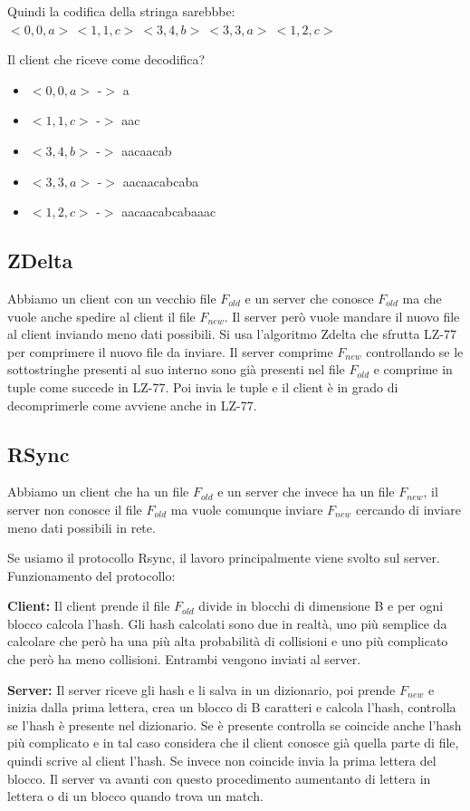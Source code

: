 \documentclass[14pt]{extreport}
\begin{document}
Quindi la codifica della stringa sarebbbe: $<0,0,a>\, <1,1,c> \ <3,4,b>\ <3,3,a> \ <1,2,c>$

\newline
Il client che riceve come decodifica?

\begin{itemize}
    \item $<0,0,a>$ -$>$ a
    \item $<1,1,c>$ -$>$ aac
    \item $<3,4,b>$ -$>$ aacaacab
    \item $<3,3,a>$ -$>$ aacaacabcaba
    \item $<1,2,c>$ -$>$ aacaacabcabaaac
\end{itemize}

\subsection{ZDelta}

Abbiamo un client con un vecchio file $F_{old}$ e un server che conosce $F_{old}$ ma che vuole anche spedire al client il file $F_{new}$.
Il server però vuole mandare il nuovo file al client inviando meno dati possibili.
Si usa l'algoritmo Zdelta che sfrutta LZ-77 per comprimere il nuovo file da inviare.
Il server comprime $F_{new}$ controllando se le sottostringhe presenti al suo interno sono già presenti nel file $F_{old}$ e comprime in tuple come succede in LZ-77.
Poi invia le tuple e il client è in grado di decomprimerle come avviene anche in LZ-77.

\subsection{RSync}

Abbiamo un client che ha un file $F_{old}$ e un server che invece ha un file $F_{new}$, il server non conosce il file $F_{old}$ ma vuole comunque inviare $F_{new}$ cercando di inviare meno dati possibili in rete.

Se usiamo il protocollo Rsync, il lavoro principalmente viene svolto sul server.
Funzionamento del protocollo:

{\bf Client:} Il client prende il file $F_{old}$ divide in blocchi di dimensione B e per ogni blocco calcola l'hash. Gli hash calcolati sono due in realtà, uno più semplice da calcolare che però ha una più alta probabilità di collisioni e uno più complicato che però ha meno collisioni. Entrambi vengono inviati al server.

{\bf Server:} Il server riceve gli hash e li salva in un dizionario, poi prende $F_{new}$ e inizia dalla prima lettera, crea un blocco di B caratteri e calcola l'hash, controlla se l'hash è presente nel dizionario. Se è presente controlla se coincide anche l'hash più complicato e in tal caso considera che il client conosce già quella parte di file, quindi scrive al client l'hash. 
Se invece non coincide invia la prima lettera del blocco.
Il server va avanti con questo procedimento aumentanto di lettera in lettera o di un blocco quando trova un match.
\end{document}
